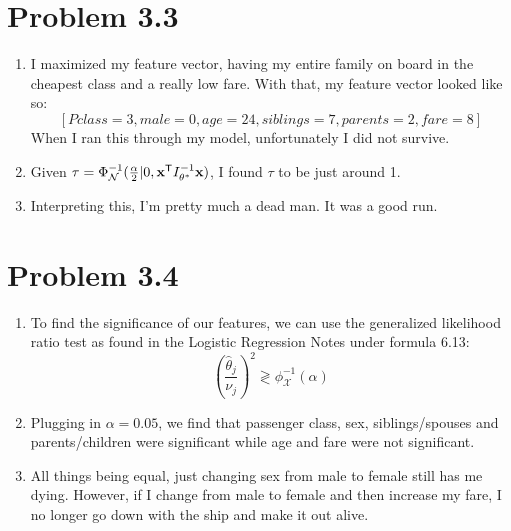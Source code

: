 \documentclass{article}
\begin{document}
\section*{Problem 3.3}
\begin{enumerate}[label=(\alph*)]
  \item I maximized my feature vector, having my entire family on board in the cheapest class and a really low fare. With that, my feature vector looked like so: \[[Pclass=3, male=0, age=24, siblings=7, parents=2, fare=8]\] When I ran this through my model, unfortunately I did not survive.
  \item Given $\tau = \Phi^{-1}_{\mathcal{N}}(\frac{\alpha}{2} | 0, \textbf{x}^{\sf{T}}I^{-1}_{\theta^*}\textbf{x})$, I found $\tau$ to be just around 1.
  \item Interpreting this, I'm pretty much a dead man. It was a good run.
\end{enumerate}

\section*{Problem 3.4}
\begin{enumerate}[label=(\alph*)]
  \item To find the significance of our features, we can use the generalized likelihood ratio test as found in the Logistic Regression Notes under formula 6.13: \[(\frac{\hat{\theta}_j}{\nu_j})^2 \gtrless \phi^{-1}_{\mathcal{X}}(\alpha) \]
  \item Plugging in $\alpha = 0.05$, we find that passenger class, sex, siblings/spouses and parents/children were significant while age and fare were not significant.
  \item All things being equal, just changing sex from male to female still has me dying. However, if I change from male to female and then increase my fare, I no longer go down with the ship and make it out alive.
\end{enumerate}
\end{document}
